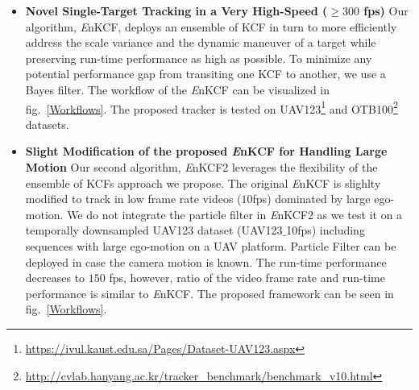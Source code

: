 \documentclass{bmvc2k}
\begin{document}
\begin{itemize}
\item \textbf{Novel Single-Target Tracking in a Very High-Speed ($\geq300$ fps) } Our
  algorithm, {\it E}nKCF, deploys an ensemble of KCF in turn to more
  efficiently address the scale variance and the dynamic maneuver of a
  target while preserving run-time performance as high as possible. To
  minimize any potential performance gap from transiting one KCF to
  another, we use a Bayes filter. The workflow of the  {\it E}nKCF can
  be visualized in fig.~\ref{Workflows}. The proposed tracker is tested on UAV123\footnote{\url{https://ivul.kaust.edu.sa/Pages/Dataset-UAV123.aspx}} and OTB100\footnote{\url{http://cvlab.hanyang.ac.kr/tracker_benchmark/benchmark_v10.html}}
  datasets. 

\item \textbf{Slight Modification of the proposed {\it E}nKCF for
  Handling Large Motion} Our second algorithm, {\it E}nKCF2 leverages
  the flexibility of the ensemble of KCFs approach we propose. The
  original {\it E}nKCF is slighlty modified to track in low frame rate
  videos ($10$fps) dominated by large ego-motion. We do not integrate
  the particle filter in {\it E}nKCF2 as we test it on a temporally
  downsampled UAV123 dataset (UAV123$\_$10fps) including sequences
  with large ego-motion on a UAV platform. Particle Filter can be
  deployed in case the camera motion is known. The run-time
  performance decreases to $150$ fps, however, ratio of the video
  frame rate and run-time performance is similar to {\it E}nKCF. The
  proposed framework can be seen in fig.~\ref{Workflows}.

\end{itemize}
\end{document}

